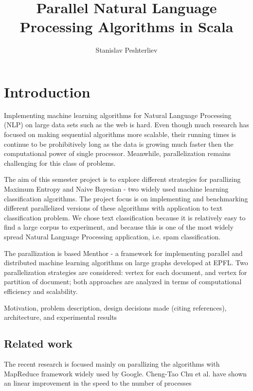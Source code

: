 \documentclass{report}
\author{Stanislav Peshterliev}
\title{Parallel Natural Language Processing Algorithms in Scala}
\begin{document}
\maketitle

\tableofcontents

\chapter{Introduction}

Implementing machine learning algorithms for Natural Language Processing (NLP) on large data sets such as the web is hard.  Even though much research has focused on making sequential algorithms more scalable, their running times is continue to be prohibitively long as the data is growing much faster then the computational power of single processor. Meanwhile, parallelization remains challenging for this class of problems. 

The aim of this semester project is to explore different strategies for parallizing Maximum Entropy\cite{berger_a1-etal:1996a} and Naive Bayesian\cite{Rennie03} - two widely used machine learning classification algorithms.  The project focus is on implementing and benchmarking different parallelized versions of these algorithms with application to text classification problem. We chose text classification because it is relatively easy to find a large corpus to experiment, and  because this is one of the most widely spread Natural Language Processing application, i.e. spam classification. 

The parallization is based Menthor\cite{oai:infoscience.epfl.ch:165111} - a framework for implementing parallel and distributed machine learning algorithms on large graphs developed at EPFL. Two parallelization strategies are considered: vertex for each document, and vertex for partition of document; both approaches are analyzed in terms of computational efficiency and scalability.

Motivation, problem description, design decisions made (citing references), architecture, and experimental results

\section{Related work}

The recent research is focused mainly on parallizing the algorithms with MapReduce\cite{Dean:2008:MSD:1327452.1327492} framework widely used by Google. Cheng-Tao Chu et al. have shown an linear improvement in the speed to the number of processes \cite{conf/nips/ChuKLYBNO06}
\end{document}
